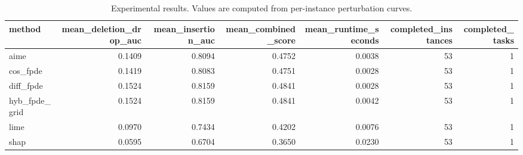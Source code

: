\begin{table}[t]
\caption{Experimental results. Values are computed from per-instance perturbation curves.}
\label{tab:main_results_computed}
\centering
\begin{tabular}{lrrrrrr}
\toprule
method & mean\_deletion\_drop\_auc & mean\_insertion\_auc & mean\_combined\_score & mean\_runtime\_seconds & completed\_instances & completed\_tasks \\
\midrule
aime & 0.1409 & 0.8094 & 0.4752 & 0.0038 & 53 & 1 \\
cos\_fpde & 0.1419 & 0.8083 & 0.4751 & 0.0028 & 53 & 1 \\
diff\_fpde & 0.1524 & 0.8159 & 0.4841 & 0.0028 & 53 & 1 \\
hyb\_fpde\_grid & 0.1524 & 0.8159 & 0.4841 & 0.0042 & 53 & 1 \\
lime & 0.0970 & 0.7434 & 0.4202 & 0.0076 & 53 & 1 \\
shap & 0.0595 & 0.6704 & 0.3650 & 0.0230 & 53 & 1 \\
\bottomrule
\end{tabular}

\end{table}
